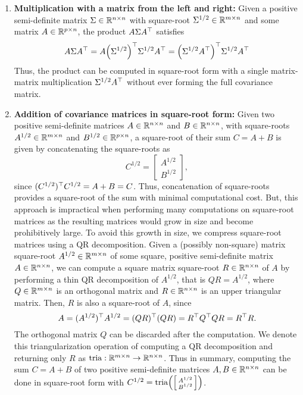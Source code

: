 \documentclass{mimosis}
\begin{document}
\begin{enumerate}
\item \textbf{Multiplication with a matrix from the left and right:}
Given a positive semi-definite matrix \(\Sigma \in \mathbb{R}^{n \times n}\) with square-root \(\Sigma^{1/2} \in \mathbb{R}^{m \times n}\) and some matrix \(A \in \mathbb{R}^{p \times n}\), the product \(A \Sigma A^\top\) satisfies
\begin{equation}
A \Sigma A^\T = A \left( \Sigma^{1/2} \right)^\T \Sigma^{1/2} A^\T = \left( \Sigma^{1/2} A^\T \right)^\T \Sigma^{1/2} A^\T
\end{equation}
Thus, the product can be computed in square-root form with a single matrix-matrix multiplication \(\Sigma^{1/2} A^\top\) without ever forming the full covariance matrix.
\item \textbf{Addition of covariance matrices in square-root form:}
Given two positive semi-definite matrices
\(A \in \mathbb{R}^{n \times n}\) and \(B \in \mathbb{R}^{n \times n}\),
with square-roots
\(A^{1/2} \in \mathbb{R}^{m \times n}\) and \({B^{1/2} \in \mathbb{R}^{p \times n}}\),
a square-root of their sum \(C = A + B\) is given by concatenating the square-roots as
\begin{equation}
C^{1/2} = \begin{bmatrix} A^{1/2} \\ B^{1/2} \end{bmatrix},
\end{equation}
since \((C^{1/2})^\top C^{1/2} = A + B = C\).
Thus, concatenation of square-roots provides a square-root of the sum with minimal computational cost.
But, this approach is impractical when performing many computations on square-root matrices as the resulting matrices would grow in size and become prohibitively large.
To avoid this growth in size, we compress square-root matrices using a QR decomposition.
Given a (possibly non-square) matrix square-root \(A^{1/2} \in \mathbb{R}^{m \times n}\) of some square, positive semi-definite matrix \(A \in \mathbb{R}^{n \times n}\),
we can compute a square matrix square-root \(R \in \mathbb{R}^{n \times n}\) of \(A\) by performing a thin QR decomposition of \(A^{1/2}\), that is
\(Q R = A^{1/2}\),
where \(Q \in \mathbb{R}^{m \times n}\) is an orthogonal matrix and \(R \in \mathbb{R}^{n \times n}\) is an upper triangular matrix.
Then, \(R\) is also a square-root of \(A\), since
\begin{equation}
A = (A^{1/2})^\top A^{1/2} = (Q R)^\top (Q R) = R^\top Q^\top Q R = R^\top R.
\end{equation}
The orthogonal matrix \(Q\) can be discarded after the computation.
We denote this triangularization operation of computing a QR decomposition and returning only \(R\) as \(\tria: \mathbb{R}^{m \times n} \to \mathbb{R}^{n \times n}\).
Thus in summary, computing the sum \(C = A + B\) of two positive semi-definite matrices \(A, B \in \mathbb{R}^{n \times n}\) can be done in square-root form with
\(C^{1/2} = \tria( \smqty[ A^{1/2} \\ B^{1/2} ])\).
\end{enumerate}
\end{document}
